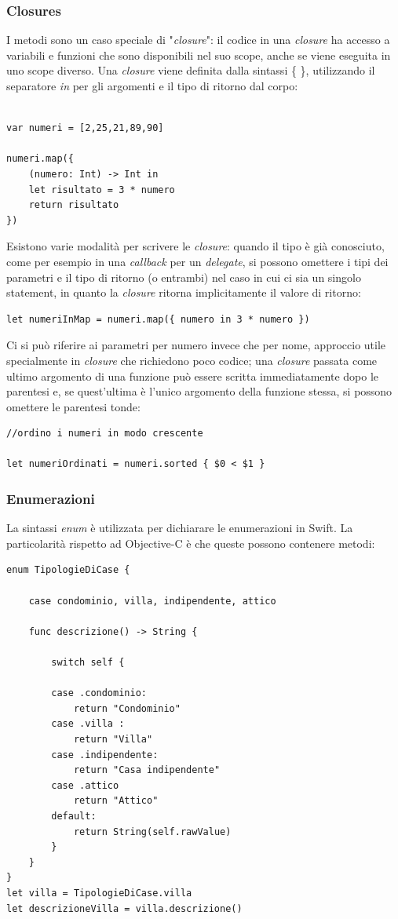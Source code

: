 \subsubsection{Closures}
I metodi sono un caso speciale di "\textit{closure}": il codice in una \textit{closure} ha accesso a variabili e funzioni che sono disponibili nel suo scope, anche se viene eseguita in uno scope diverso. Una \textit{closure} viene definita dalla sintassi \{ \}, utilizzando il separatore \textit{in} per gli argomenti e il tipo di ritorno dal corpo:\\\\ 
\lstset{language=[Objective]C, breakindent=40pt, breaklines}
\begin{lstlisting}
var numeri = [2,25,21,89,90]

numeri.map({
	(numero: Int) -> Int in 
	let risultato = 3 * numero 
	return risultato 
})
\end{lstlisting}
Esistono varie modalità per scrivere le \textit{closure}: quando il tipo è già conosciuto, come per esempio in una \textit{callback} per un \textit{delegate}, si possono omettere i tipi dei parametri e il tipo di ritorno (o entrambi) nel caso in cui ci sia un singolo statement, in quanto la \textit{closure} ritorna implicitamente il valore di ritorno:
\lstset{language=[Objective]C, breakindent=40pt, breaklines}
\begin{lstlisting}
let numeriInMap = numeri.map({ numero in 3 * numero })
\end{lstlisting}
Ci si può riferire ai parametri per numero invece che per nome, approccio utile specialmente in \textit{closure} che richiedono poco codice; una \textit{closure} passata come ultimo argomento di una funzione può essere scritta immediatamente dopo le parentesi e, se quest'ultima è l'unico argomento della funzione stessa, si possono omettere le parentesi tonde: 
\lstset{language=[Objective]C, breakindent=40pt, breaklines}
\begin{lstlisting}
//ordino i numeri in modo crescente

let numeriOrdinati = numeri.sorted { $0 < $1 }
\end{lstlisting}
\subsubsection{Enumerazioni}
La sintassi \textit{enum} è utilizzata per dichiarare le enumerazioni in Swift. La particolarità rispetto ad Objective-C è che queste possono contenere metodi:
\lstset{language=[Objective]C, breakindent=40pt, breaklines}
\begin{lstlisting}
enum TipologieDiCase {

	case condominio, villa, indipendente, attico
	
	func descrizione() -> String {
	
		switch self {
	
		case .condominio:
			return "Condominio"
		case .villa :
			return "Villa"
		case .indipendente:
			return "Casa indipendente"
		case .attico
			return "Attico"
		default: 
			return String(self.rawValue)
		}
	}
}
let villa = TipologieDiCase.villa
let descrizioneVilla = villa.descrizione()
\end{lstlisting}
